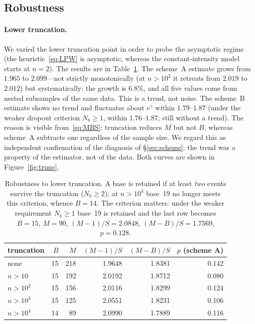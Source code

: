 \documentclass[11pt,a4paper]{article}
\theoremstyle{plain}
\theoremstyle{remark}
\newcommand{\eg}{e^{\gamma}}
\begin{document}
\subsection{Robustness}\label{sec:robust}

\paragraph{Lower truncation.} We varied the lower truncation point in order to
probe the asymptotic regime (the heuristic~\eqref{eq:LPW} is asymptotic, whereas
the constant-intensity model starts at $n=2$). The results are in
Table~\ref{tab:trunc}. The scheme~A estimate grows from $1.965$ to $2.099$---not
strictly monotonically (at $n>10^{2}$ it retreats from $2.019$ to $2.012$) but
systematically: the growth is $6.8\%$, and all five values come from nested
subsamples of the same data. This is a trend, not noise. The scheme~B estimate
shows no trend and fluctuates about $\eg$ within $1.79$--$1.87$ (under the
weaker dropout criterion $N_b\ge1$, within $1.76$--$1.87$, still without a
trend). The reason is visible from~\eqref{eq:MBS}: truncation reduces $M$ but
not $B$, whereas scheme~A subtracts one regardless of the sample size. We regard
this as independent confirmation of the diagnosis of \S\ref{sec:scheme}: the
trend was a property of the estimator, not of the data. Both curves are shown in
Figure~\ref{fig:trunc}.

\begin{table}[t]
\centering
\caption{Robustness to lower truncation. A base is retained if at least
\emph{two} events survive the truncation ($N_b\ge2$); at $n>10^4$ base~19 no
longer meets this criterion, whence $B=14$. The criterion matters: under the
weaker requirement $N_b\ge1$ base~19 is retained and the last row becomes
$B=15$, $M=90$, $(M-1)/S=2.0848$, $(M-B)/S=1.7569$, $p=0.128$.}
\label{tab:trunc}
\small
\begin{tabular}{lrrrrr}
\toprule
truncation & $B$ & $M$ & $(M-1)/S$ & $(M-B)/S$ & $p$ (scheme A)\\
\midrule
none & 15 & 218 & 1.9648 & 1.8381 & 0.142\\
$n>10$ & 15 & 192 & 2.0192 & 1.8712 & 0.080\\
$n>10^2$ & 15 & 156 & 2.0116 & 1.8299 & 0.124\\
$n>10^3$ & 15 & 125 & 2.0551 & 1.8231 & 0.106\\
$n>10^4$ & 14 & 89 & 2.0990 & 1.7889 & 0.116\\
\bottomrule
\end{tabular}
\end{table}
\end{document}
